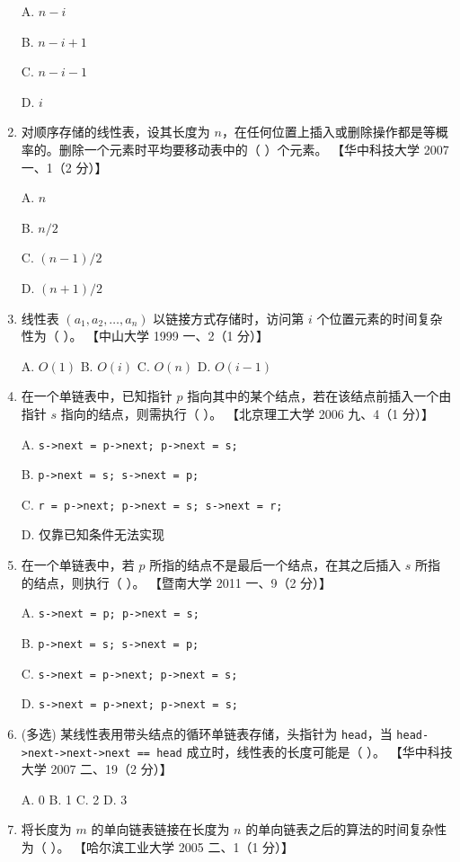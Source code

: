 \documentclass[lang=cn,newtx,10pt,scheme=chinese]{../../elegantbook}
\begin{document}
\begin{enumerate}
    A. $n-i$  

    B. $n-i+1$  

    C. $n-i-1$  

    D. $i$  

    \item 对顺序存储的线性表，设其长度为 $n$，在任何位置上插入或删除操作都是等概率的。删除一个元素时平均要移动表中的（ ）个元素。  
    【华中科技大学 2007 一、1（2 分）】  

    A. $n$  

    B. $n/2$  

    C. $(n-1)/2$  

    D. $(n+1)/2$ 

    \item 线性表 $(a_1, a_2, \dots, a_n)$ 以链接方式存储时，访问第 $i$ 个位置元素的时间复杂性为（ ）。  
    【中山大学 1999 一、2（1 分）】 

    A. $O(1)$ \quad B. $O(i)$ \quad C. $O(n)$ \quad D. $O(i-1)$  

    \item 在一个单链表中，已知指针 $p$ 指向其中的某个结点，若在该结点前插入一个由指针 $s$ 指向的结点，则需执行（ ）。  
    【北京理工大学 2006 九、4（1 分）】  

    A. \texttt{s->next = p->next; p->next = s;}  

    B. \texttt{p->next = s; s->next = p;}  

    C. \texttt{r = p->next; p->next = s; s->next = r;}  

    D. 仅靠已知条件无法实现  

    \item 在一个单链表中，若 $p$ 所指的结点不是最后一个结点，在其之后插入 $s$ 所指的结点，则执行（ ）。  
    【暨南大学 2011 一、9（2 分）】  

    A. \texttt{s->next = p; p->next = s;}  

    B. \texttt{p->next = s; s->next = p;}  

    C. \texttt{s->next = p->next; p->next = s;}  

    D. \texttt{s->next = p->next; p->next = s;}  

    \item (多选) 某线性表用带头结点的循环单链表存储，头指针为 \texttt{head}，当 \texttt{head->next->next->next == head} 成立时，线性表的长度可能是（ ）。  
    【华中科技大学 2007 二、19（2 分）】  

    A. 0 \quad B. 1 \quad C. 2 \quad D. 3  

    \item 将长度为 $m$ 的单向链表链接在长度为 $n$ 的单向链表之后的算法的时间复杂性为（ ）。  
    【哈尔滨工业大学 2005 二、1（1 分）】 


\end{enumerate}
\end{document}
